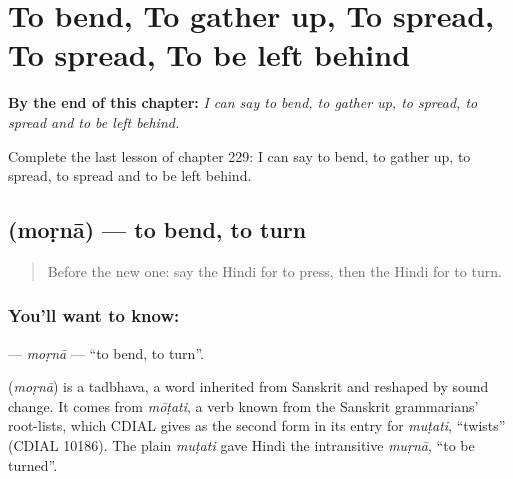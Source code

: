 
\chapter{To bend, To gather up, To spread, To spread, To be left behind}
\label{ch:hi-to-bend-to-gather-up-to-spread-to-spread-to-be-left-behind}

\begin{chapteropening}
\textbf{By the end of this chapter:} \emph{I can say to bend, to gather up, to spread, to spread and to be left behind.}

Complete the last lesson of chapter 229: I can say to bend, to gather up, to spread, to spread and to be left behind.
\end{chapteropening}

\section[\texorpdfstring{\hi{मोड़ना} (moṛnā)}{मोड़ना (moṛnā)}]{ (moṛnā) — to bend, to turn}

\label{lesson:HI-C229-morna}



\begin{quote}
Before the new one: say the Hindi for to press, then the Hindi for to turn.
\end{quote}

\subsection*{You'll want to know: }
\textbf{} — \emph{moṛnā} — \textquotedblleft{}to bend, to turn\textquotedblright{}.

\begin{cousinweb}
\textbf{} (\emph{moṛnā}) is a tadbhava, a word inherited from Sanskrit and reshaped by sound change. It comes from \emph{mōṭati}, a verb known from the Sanskrit grammarians' root-lists, which CDIAL gives as the second form in its entry for \emph{muṭati}, \textquotedblleft{}twists\textquotedblright{} (CDIAL 10186). The plain \emph{muṭati} gave Hindi the intransitive \emph{muṛnā}, \textquotedblleft{}to be turned\textquotedblright{}.
\end{cousinweb}

